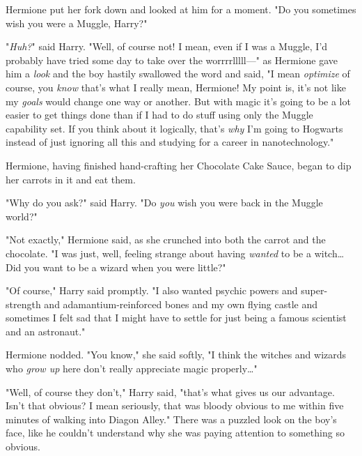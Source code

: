 Hermione put her fork down and looked at him for a moment. "Do you sometimes
wish you were a Muggle, Harry?"

"\emph{Huh?}" said Harry. "Well, of course not! I mean, even if I was a Muggle,
I'd probably have tried some day to take over the worrrrlllll---" as Hermione gave
him a \emph{look} and the boy hastily swallowed the word and said, "I mean
\emph{optimize} of course, you \emph{know} that's what I really mean, Hermione!
My point is, it's not like my \emph{goals} would change one way or another. But
with magic it's going to be a lot easier to get things done than if I had to do
stuff using only the Muggle capability set. If you think about it logically,
that's \emph{why} I'm going to Hogwarts instead of just ignoring all this and
studying for a career in nanotechnology."

Hermione, having finished hand-crafting her Chocolate Cake Sauce, began to dip
her carrots in it and eat them.

"Why do you ask?" said Harry. "Do \emph{you} wish you were back in the Muggle
world?"

"Not exactly," Hermione said, as she crunched into both the carrot and the
chocolate. "I was just, well, feeling strange about having \emph{wanted} to be
a witch{\ldots} Did you want to be a wizard when you were little?"

"Of course," Harry said promptly. "I also wanted psychic powers and
super-strength and adamantium-reinforced bones and my own flying castle and
sometimes I felt sad that I might have to settle for just being a famous
scientist and an astronaut."

Hermione nodded. "You know," she said softly, "I think the witches and wizards
who \emph{grow up} here don't really appreciate magic properly{\ldots}"

"Well, of course they don't," Harry said, "that's what gives us our advantage.
Isn't that obvious? I mean seriously, that was bloody obvious to me within five
minutes of walking into Diagon Alley." There was a puzzled look on the boy's
face, like he couldn't understand why she was paying attention to something so
obvious.
